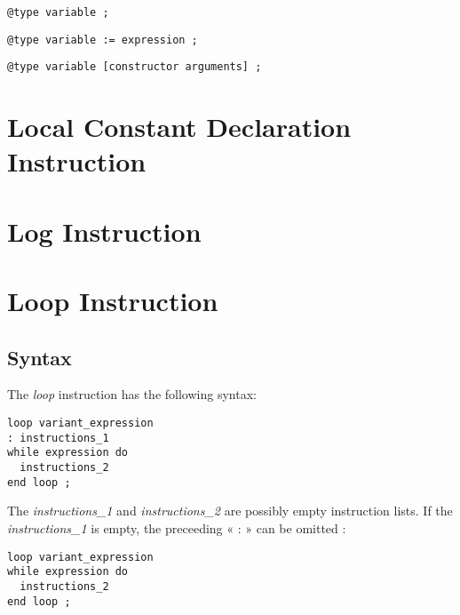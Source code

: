 {
\begin{lstlisting}[language=galgas]
@type variable ;
\end{lstlisting}
}

{
\begin{lstlisting}[language=galgas]
@type variable := expression ;
\end{lstlisting}
}

{
\begin{lstlisting}[language=galgas]
@type variable [constructor arguments] ;
\end{lstlisting}
}


\section{Local Constant Declaration Instruction}




\section{Log Instruction}




\section{Loop Instruction}


\subsection{Syntax}

The \emph{loop} instruction has the following syntax:
{
\begin{lstlisting}[language=galgas]
loop variant_expression
: instructions_1
while expression do
  instructions_2
end loop ;  
\end{lstlisting}
}

The \emph{instructions\_1} and \emph{instructions\_2} are possibly empty instruction lists. If the \emph{instructions\_1} is empty, the preceeding « : » can be omitted :
{
\begin{lstlisting}[language=galgas]
loop variant_expression
while expression do
  instructions_2
end loop ;  
\end{lstlisting}
}

